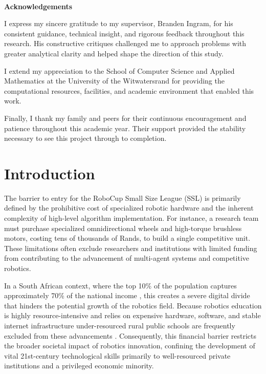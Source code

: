 \documentclass[a4paper,twoside,12pt]{report}
\newenvironment{acknowledgements}{\ \vfill\begin{center}\textbf{Acknowledgements}\end{center}\addcontentsline{toc}{section}{Acknowledgements}}{\vfill\vfill\newpage}
\begin{document}
\begin{acknowledgements}
I express my sincere gratitude to my supervisor, Branden Ingram, for his consistent guidance, technical insight, and rigorous feedback throughout this research. His constructive critiques challenged me to approach problems with greater analytical clarity and helped shape the direction of this study.

I extend my appreciation to the School of Computer Science and Applied Mathematics at the University of the Witwatersrand for providing the computational resources, facilities, and academic environment that enabled this work.

Finally, I thank my family and peers for their continuous encouragement and patience throughout this academic year. Their support provided the stability necessary to see this project through to completion.
\end{acknowledgements}

{}
\tableofcontents
\newpage

{}
\listoffigures
\newpage

{}
\listoftables
\newpage


\chapter{Introduction} \label{chapter: introduction}

The barrier to entry for the RoboCup Small Size League (SSL) is primarily defined by the prohibitive cost of specialized robotic hardware and the inherent complexity of high-level algorithm implementation. For instance, a research team must purchase specialized omnidirectional wheels and high-torque brushless motors, costing tens of thousands of Rands, to build a single competitive unit. These limitations often exclude researchers and institutions with limited funding from contributing to the advancement of multi-agent systems and competitive robotics.

In a South African context, where the top 10\% of the population captures approximately 70\% of the national income \citep{czajka2026thirty}, this creates a severe digital divide that hinders the potential growth of the robotics field. Because robotics education is highly resource-intensive and relies on expensive hardware, software, and stable internet infrastructure under-resourced rural public schools are frequently excluded from these advancements \citep{mapheto2023teachers}. Consequently, this financial barrier restricts the broader societal impact of robotics innovation, confining the development of vital 21st-century technological skills primarily to well-resourced private institutions and a privileged economic minority.
\end{document}
